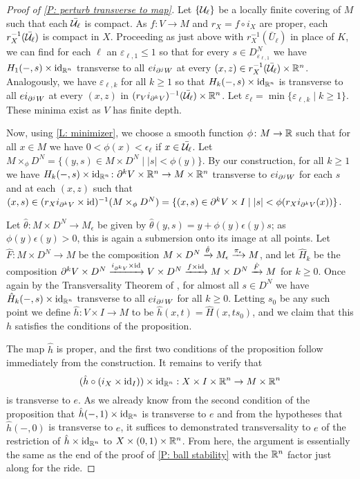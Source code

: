 \begin{proof}[Proof of \cref{P: perturb transverse to map}]
	Let $\{\mathcal{U}_\ell\}$ be a locally finite covering of $M$ such that each $\bar{\mathcal{U}_\ell}$ is compact.
	As $f \colon V \to M$ and $r_X = f \circ i_{X}$ are proper, each $r^{-1}_X(\bar {\mathcal{U}_\ell})$ is compact in $X$.
	Proceeding as just above with $r_X^{-1}(\bar U_\ell)$ in place of $K$, we can find for each $\ell$ an $\varepsilon_{\ell,1} \leq 1$ so that for every $s \in D^N_{\varepsilon_{\ell,1}}$ we have $H_1(-,s) \times \mathrm{id}_{\mathbb{R}^n}$ transverse to all $ei_{\partial^jW}$ at every $(x,z) \in r^{-1}_X(\bar {\mathcal{U}_\ell}) \times \mathbb{R}^n$.
	Analogously, we have $\varepsilon_{\ell,k}$ for all $k\geq 1$ so that $H_k(-,s) \times \mathrm{id}_{\mathbb{R}^n}$ is transverse to all $ei_{\partial^jW}$ at every $(x,z)$ in $(r_Vi_{\partial^kV})^{-1}(\bar {\mathcal{U}_\ell}) \times \mathbb{R}^n$.
	Let $\varepsilon_\ell = \min\{\varepsilon_{\ell,k} \mid k\geq 1\}$.
	These minima exist as $V$ has finite depth.

	Now, using \cref{L: minimizer}, we choose a smooth function $\phi \colon M \to \mathbb{R}$ such that for all $x \in M$ we have $0<\phi(x)<\epsilon_\ell$ if $x \in \bar{\mathcal{U}_\ell}$.
	Let $M\times_\phi D^N = \{(y,s) \in M \times D^N \mid |s|<\phi(y)\}$.
	By our construction, for all $k\geq 1$ we have $H_k(-,s) \times \mathrm{id}_{\mathbb{R}^n} \colon \partial^{k}V \times \mathbb{R}^n \to M \times \mathbb{R}^n$ transverse to $ei_{\partial^jW}$ for each $s$ and at each $(x,z)$ such that $(x,s)\in(r_Xi_{\partial^{k}V} \times \mathrm{id})^{-1}(M\times_\phi D^N) = \{(x,s) \in \partial^{k}V \times I \mid |s|<\phi(r_Xi_{\partial^kV}(x))\}$.

	Let $\hat \theta: M \times D^N \to M_\epsilon$ be given by $\hat \theta(y, s) = y +\phi(y) \epsilon(y) s$; as $\phi(y)\epsilon(y)>0$, this is again a submersion onto its image at all points.
	Let $\hat F \colon M \times D^N \to M$ be the composition $M \times D^N \xrightarrow{\hat \theta}M_\epsilon \xrightarrow{\pi_\epsilon}M$, and let $\hat H_k$ be the composition $\partial^kV \times D^N \xrightarrow{i_{\partial^kV} \times \mathrm{id}}V \times D^N \xrightarrow{f \times \mathrm{id}} M \times D^N \xrightarrow{\hat F} M$ for $k\geq 0$.
	Once again by the Transversality Theorem of \cite[Section 2.3]{GuPo74}, for almost all $s \in D^N$ we have $\hat H_k(-,s) \times \mathrm{id}_{\mathbb{R}^n}$ transverse to all $ei_{\partial^jW}$
	for all $k\geq 0$.
	Letting $s_0$ be any such point we define $\hat h \colon V \times I \to M$ to be $\hat h(x,t) = \hat H(x,ts_0)$, and we claim that this $h$ satisfies the conditions of the proposition.

	The map $\hat h$ is proper, and the first two conditions of the proposition follow immediately from the construction.
	It remains to verify that $$(\hat h \circ (i_{X} \times \mathrm{id}_I)) \times \mathrm{id}_{\mathbb{R}^n}: X \times I \times \mathbb{R}^n \to M \times \mathbb{R}^n$$ is transverse to $e$.
	As we already know from the second condition of the proposition that $\hat h(-,1) \times \mathrm{id}_{\mathbb{R}^n}$ is transverse to $e$ and from the hypotheses that $\hat h(-,0)$ is transverse to $e$, it suffices to demonstrated transversality to $e$ of the restriction of $\hat h \times \mathrm{id}_{\mathbb{R}^n}$ to $X \times (0,1) \times \mathbb{R}^n$.
	From here, the argument is essentially the same as the end of the proof of \cref{P: ball stability} with the $\mathbb{R}^n$ factor just along for the ride.


\end{proof}
